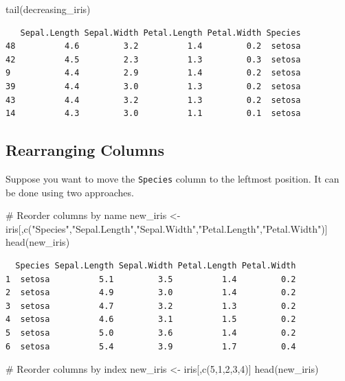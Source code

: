 \documentclass[
  letterpaper,
]{book}
\newenvironment{Shaded}{\begin{snugshade}}{\end{snugshade}}
\newcommand{\CommentTok}[1]{\textcolor[rgb]{0.37,0.37,0.37}{#1}}
\newcommand{\DecValTok}[1]{\textcolor[rgb]{0.68,0.00,0.00}{#1}}
\newcommand{\FunctionTok}[1]{\textcolor[rgb]{0.28,0.35,0.67}{#1}}
\newcommand{\NormalTok}[1]{\textcolor[rgb]{0.00,0.23,0.31}{#1}}
\newcommand{\OtherTok}[1]{\textcolor[rgb]{0.00,0.23,0.31}{#1}}
\newcommand{\StringTok}[1]{\textcolor[rgb]{0.13,0.47,0.30}{#1}}
\begin{document}
\begin{Shaded}
\begin{Highlighting}[]
\FunctionTok{tail}\NormalTok{(decreasing\_iris)}
\end{Highlighting}
\end{Shaded}

\begin{verbatim}
   Sepal.Length Sepal.Width Petal.Length Petal.Width Species
48          4.6         3.2          1.4         0.2  setosa
42          4.5         2.3          1.3         0.3  setosa
9           4.4         2.9          1.4         0.2  setosa
39          4.4         3.0          1.3         0.2  setosa
43          4.4         3.2          1.3         0.2  setosa
14          4.3         3.0          1.1         0.1  setosa
\end{verbatim}

\subsection{Rearranging Columns}\label{rearranging-columns}

Suppose you want to move the \texttt{Species} column to the leftmost
position. It can be done using two approaches.

\begin{Shaded}
\begin{Highlighting}[]
\CommentTok{\# Reorder columns by name}
\NormalTok{new\_iris }\OtherTok{\textless{}{-}}\NormalTok{ iris[,}\FunctionTok{c}\NormalTok{(}\StringTok{"Species"}\NormalTok{,}\StringTok{"Sepal.Length"}\NormalTok{,}\StringTok{"Sepal.Width"}\NormalTok{,}\StringTok{"Petal.Length"}\NormalTok{,}\StringTok{"Petal.Width"}\NormalTok{)]}
\FunctionTok{head}\NormalTok{(new\_iris)}
\end{Highlighting}
\end{Shaded}

\begin{verbatim}
  Species Sepal.Length Sepal.Width Petal.Length Petal.Width
1  setosa          5.1         3.5          1.4         0.2
2  setosa          4.9         3.0          1.4         0.2
3  setosa          4.7         3.2          1.3         0.2
4  setosa          4.6         3.1          1.5         0.2
5  setosa          5.0         3.6          1.4         0.2
6  setosa          5.4         3.9          1.7         0.4
\end{verbatim}

\begin{Shaded}
\begin{Highlighting}[]
\CommentTok{\# Reorder columns by index}
\NormalTok{new\_iris }\OtherTok{\textless{}{-}}\NormalTok{ iris[,}\FunctionTok{c}\NormalTok{(}\DecValTok{5}\NormalTok{,}\DecValTok{1}\NormalTok{,}\DecValTok{2}\NormalTok{,}\DecValTok{3}\NormalTok{,}\DecValTok{4}\NormalTok{)]}
\FunctionTok{head}\NormalTok{(new\_iris)}
\end{Highlighting}
\end{Shaded}
\end{document}
